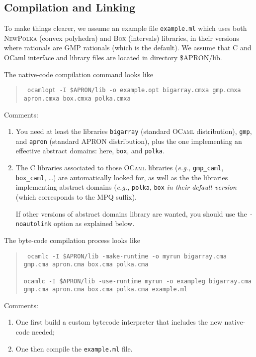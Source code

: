 \documentclass[twoside,10pt,a4paper]{report}
\begin{document}
\subsection*{Compilation and Linking}

To make things clearer, we assume an example file
\texttt{example.ml} which uses both \textsc{NewPolka} (convex
polyhedra) and \textsc{Box} (intervals) libraries, in their
versions where rationals are GMP rationals (which is the default).
We assume that C and OCaml interface and library files are located
in directory \$APRON/lib.

The native-code compilation command looks like
\begin{quote}\tt
  ocamlopt -I \$APRON/lib -o example.opt bigarray.cmxa gmp.cmxa apron.cmxa box.cmxa polka.cmxa
\end{quote}
Comments:
\begin{enumerate}
\item You need at least the libraries \texttt{bigarray} (standard
  \textsc{OCaml} distribution), \texttt{gmp}, and \texttt{apron}
  (standard APRON distribution), plus the one implementing an
  effective abstract domains: here, \texttt{box}, and
  \texttt{polka}.
\item The C libraries associated to those \textsc{OCaml} libraries
  (\textit{e.g.,} \texttt{gmp\_caml}, \texttt{box\_caml}, \ldots)
  are automatically looked for, as well as the the libraries
  implementing abstract domains (\textit{e.g.,} \texttt{polka},
  \texttt{box} \emph{in their default version} (which corresponds
  to the MPQ suffix).
  
  If other versions of abstract domains library are wanted, you
  should use the \texttt{-noautolink} option as explained below.
\end{enumerate}

The byte-code compilation process looks like
\begin{quote}\tt
  ocamlc -I \$APRON/lib -make-runtime -o myrun bigarray.cma gmp.cma apron.cma box.cma polka.cma\\
  ~\\
  ocamlc -I \$APRON/lib -use-runtime myrun -o exampleg bigarray.cma gmp.cma apron.cma box.cma polka.cma example.ml
\end{quote}
Comments:
\begin{enumerate}
\item One first build a custom bytecode interpreter that includes the new native-code needed;
\item One then compile the \texttt{example.ml} file.
\end{enumerate}
\end{document}
